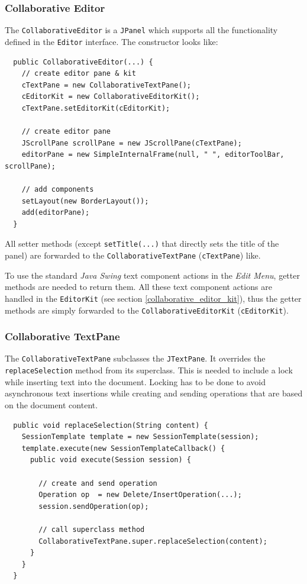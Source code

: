 \subsubsection{Collaborative Editor}
The \texttt{Collaborative\-Editor} is a \texttt{JPanel} which supports all the functionality defined in the \texttt{Editor} interface. The constructor looks like:
\begin{verbatim}
  public CollaborativeEditor(...) {
    // create editor pane & kit
    cTextPane = new CollaborativeTextPane();
    cEditorKit = new CollaborativeEditorKit();
    cTextPane.setEditorKit(cEditorKit);

    // create editor pane
    JScrollPane scrollPane = new JScrollPane(cTextPane);
    editorPane = new SimpleInternalFrame(null, " ", editorToolBar, scrollPane);

    // add components		
    setLayout(new BorderLayout());
    add(editorPane);    
  }
\end{verbatim}

All setter methods (except \texttt{setTitle(...)} that directly sets the title of the panel) are forwarded to the \texttt{Collaborative\-Text\-Pane} (\texttt{cTextPane}) like.

To use the standard \emph{Java Swing} text component actions in the \emph{Edit Menu}, getter methods are needed to return them. All these text component actions are handled in the \texttt{Editor\-Kit} (see section \ref{collaborative_editor_kit}), thus the getter methods are simply forwarded to the \texttt{Collaborative\-Editor\-Kit} (\texttt{cEditorKit}).


\subsubsection{Collaborative TextPane}
The \texttt{Collaborative\-Text\-Pane} subclasses the \texttt{JTextPane}. It overrides the \texttt{replaceSelection} method from its superclass. This is needed to include a lock while inserting text into the document. Locking has to be done to avoid asynchronous text insertions while creating and sending operations that are based on the document content.

\begin{verbatim}
  public void replaceSelection(String content) {
    SessionTemplate template = new SessionTemplate(session);
    template.execute(new SessionTemplateCallback() {
      public void execute(Session session) {

        // create and send operation
        Operation op  = new Delete/InsertOperation(...);
        session.sendOperation(op);

        // call superclass method
        CollaborativeTextPane.super.replaceSelection(content);
      }
    }
  }
\end{verbatim}

